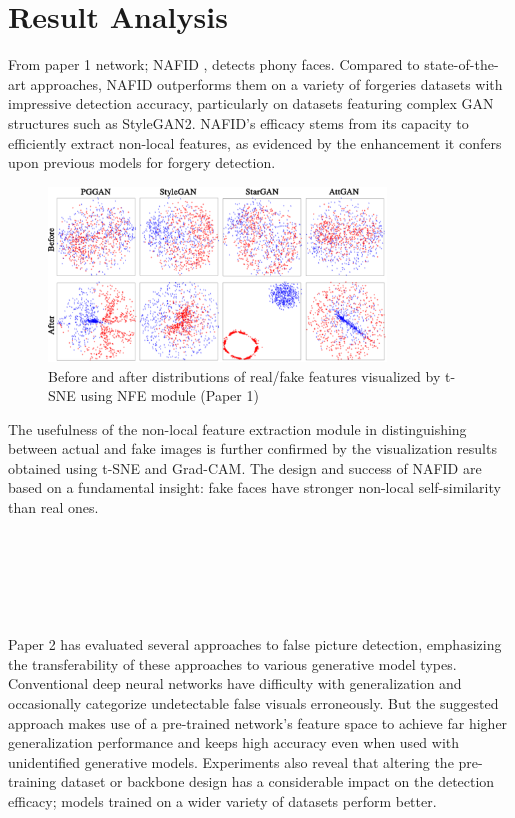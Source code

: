 \documentclass[a4paper,14pt]{report}
\begin{document}
\chapter{Result Analysis}
From paper 1 network; NAFID \cite{1}, detects phony faces. Compared to state-of-the-art approaches, NAFID outperforms them on a variety of forgeries datasets with impressive detection accuracy, particularly on datasets featuring complex GAN structures such as StyleGAN2. NAFID's efficacy stems from its capacity to efficiently extract non-local features, as evidenced by the enhancement it confers upon previous models for forgery detection.\\
\begin{figure}[H]
    \centering
    \includegraphics[width=0.8\textwidth]{Images/result_paper1.png}
    \caption{Before and after distributions of real/fake features 
    visualized by t-SNE using NFE module (Paper 1)}
    \label{fig:data_transformation}
\end{figure}
The usefulness of the non-local feature extraction module in distinguishing between actual and fake images is further confirmed by the visualization results obtained using t-SNE and Grad-CAM. The design and success of NAFID are based on a fundamental insight: fake faces have stronger non-local self-similarity than real ones.\\
\\
\\
\\
\\
\\
\\
Paper 2 has evaluated several approaches to false picture detection, emphasizing the transferability of these approaches to various generative model types. Conventional deep neural networks have difficulty with generalization and occasionally categorize undetectable false visuals erroneously. But the suggested approach makes use of a pre-trained network's feature space to achieve far higher generalization performance and keeps high accuracy even when used with unidentified generative models. Experiments also reveal that altering the pre-training dataset or backbone design has a considerable impact on the detection efficacy; models trained on a wider variety of datasets perform better.
\end{document}
